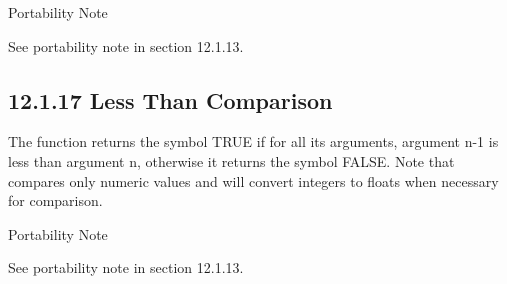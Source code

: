 \documentclass[letterpaper,10pt,english]{sphinxmanual}
\begin{document}

\begin{sphinxVerbatim}[commandchars=\\\{\}]
  
    
    
\end{sphinxVerbatim}

Portability Note

See portability note in section 12.1.13.


\subsection{12.1.17 Less Than Comparison}
\label{\detokenize{actions:less-than-comparison}}
The \sphinxstylestrong{\textless{}} function returns the symbol TRUE if for all its arguments,
argument n-1 is less than argument n, otherwise it returns the symbol
FALSE. Note that \sphinxstylestrong{\textless{}} compares only numeric values and will convert
integers to floats when necessary for comparison.


\begin{sphinxVerbatim}[commandchars=\\\{\}]
  
    
    
\end{sphinxVerbatim}

Portability Note

See portability note in section 12.1.13.
\end{document}
